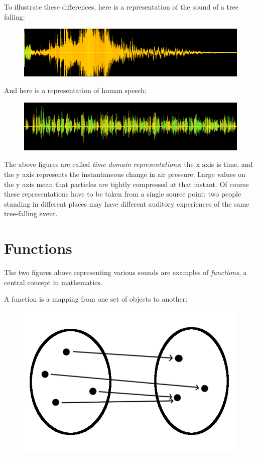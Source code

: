 \documentclass[UTF8]{book}
\begin{document}
\begin{CJK}{UTF8}{gbsn}
To illustrate these differences, here is a representation of the sound of a tree falling:

\begin{figure}[H]
\centering
\includegraphics[width=0.8\linewidth]{tree_falling_soundwave}
\end{figure}

And here is a representation of human speech:

\begin{figure}[H]
\centering
\includegraphics[width=0.8\linewidth]{shakespeare_speech}
\end{figure}

The above figures are called \emph{time domain representations}: the x axis is time, and the y axis represents the instantaneous change in air pressure. Large values on the y axis mean that particles are tightly compressed at that instant. Of course these representations have to be taken from a single source point: two people standing in different places may have different auditory experiences of the same tree-falling event.

\section{Functions}

The two figures above representing various sounds are examples of \emph{functions}, a central concept in mathematics.

A function is a mapping from one set of objects to another:

\begin{figure}[H]
\centering
\includegraphics[width=0.8\linewidth]{function_basic}
\end{figure}


\end{CJK}
\end{document}
